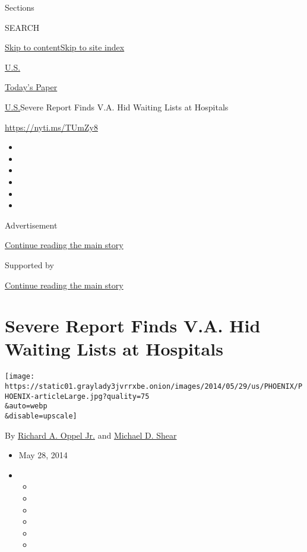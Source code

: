 Sections

SEARCH

\protect\hyperlink{site-content}{Skip to
content}\protect\hyperlink{site-index}{Skip to site index}

\href{https://www.nytimes3xbfgragh.onion/section/us}{U.S.}

\href{https://myaccount.nytimes3xbfgragh.onion/auth/login?response_type=cookie\&client_id=vi}{}

\href{https://www.nytimes3xbfgragh.onion/section/todayspaper}{Today's
Paper}

\href{/section/us}{U.S.}\textbar{}Severe Report Finds V.A. Hid Waiting
Lists at Hospitals

\url{https://nyti.ms/TUmZy8}

\begin{itemize}
\item
\item
\item
\item
\item
\item
\end{itemize}

Advertisement

\protect\hyperlink{after-top}{Continue reading the main story}

Supported by

\protect\hyperlink{after-sponsor}{Continue reading the main story}

\hypertarget{severe-report-finds-va-hid-waiting-lists-at-hospitals}{%
\section{Severe Report Finds V.A. Hid Waiting Lists at
Hospitals}\label{severe-report-finds-va-hid-waiting-lists-at-hospitals}}

\texttt{[image: https://static01.graylady3jvrrxbe.onion/images/2014/05/29/us/PHOENIX/PHOENIX-articleLarge.jpg?quality=75\\\&auto=webp\\\&disable=upscale]}

By
\href{https://www.nytimes3xbfgragh.onion/by/richard-a-oppel-jr}{Richard
A. Oppel Jr.} and
\href{http://www.nytimes3xbfgragh.onion/by/michael-d-shear}{Michael D.
Shear}

\begin{itemize}
\item
  May 28, 2014
\item
  \begin{itemize}
  \item
  \item
  \item
  \item
  \item
  \item
  \end{itemize}
\end{itemize}

